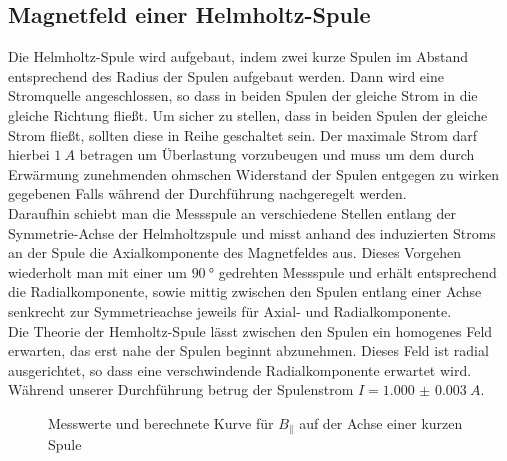 \subsection{Magnetfeld einer Helmholtz-Spule}
Die Helmholtz-Spule wird aufgebaut, indem zwei kurze Spulen im Abstand entsprechend des Radius der Spulen aufgebaut werden. Dann wird eine Stromquelle angeschlossen, so dass in beiden Spulen der gleiche Strom in die gleiche Richtung fließt. Um sicher zu stellen, dass in beiden Spulen der gleiche Strom fließt, sollten diese in Reihe geschaltet sein. Der maximale Strom darf hierbei $ \SI{1}{A} $ betragen um Überlastung vorzubeugen und muss um dem durch Erwärmung zunehmenden ohmschen Widerstand der Spulen entgegen zu wirken gegebenen Falls während der Durchführung nachgeregelt werden. \\
Daraufhin schiebt man die Messspule an verschiedene Stellen entlang der Symmetrie-Achse der Helmholtzspule und misst anhand des induzierten Stroms an der Spule die Axialkomponente des Magnetfeldes aus. Dieses Vorgehen wiederholt man mit einer um $ \SI{90}{\degree} $ gedrehten Messspule und erhält entsprechend die Radialkomponente, sowie mittig zwischen den Spulen entlang einer Achse senkrecht zur Symmetrieachse jeweils für Axial- und Radialkomponente.\\
Die Theorie der Hemholtz-Spule lässt zwischen den Spulen ein homogenes Feld erwarten, das erst nahe der Spulen beginnt abzunehmen. Dieses Feld ist radial ausgerichtet, so dass eine verschwindende Radialkomponente erwartet wird. \\
Während unserer Durchführung betrug der Spulenstrom $ I= \SI{1.000(3)}{A} $.

\begin{figure}[H]
\centering
{}
\caption{Messwerte und berechnete Kurve für $B_\parallel$ auf der Achse einer kurzen Spule}
\label{fig:axialaufachsehelm}
\end{figure}
